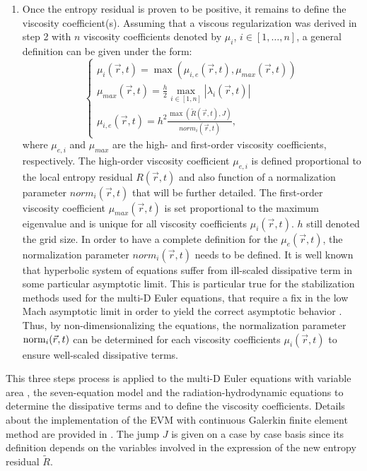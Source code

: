 \begin{enumerate}
\item Once the entropy residual is proven to be positive, it remains to define the viscosity coefficient(s). Assuming that a viscous regularization was derived in step 2 with $n$ viscosity coefficients denoted by $\mu_i$, $i\in \left[1, \dots, n\right]$, a general definition can be given under the form:
%
\begin{equation}
\left\{
\begin{array}{l}
\mu_i(\vec{r},t) = \max \left( \mu_{i,e}(\vec{r},t), \mu_{max}(\vec{r},t) \right) \nonumber \\
\mu_{max}(\vec{r},t) = \frac{h}{2} \max_{i\in \left[1,n\right]} |\lambda_i(\vec{r},t)| \nonumber \\
\mu_{i,e}(\vec{r},t) = h^2 \frac{\max\left(\tilde{R}(\vec{r},t), J\right)}{norm_i(\vec{r},t)}, \nonumber
\end{array}
\right.
\end{equation}
%
where $\mu_{e,i}$ and $\mu_{max}$ are the high- and first-order viscosity coefficients, respectively. The high-order viscosity coefficient $\mu_{e,i}$ is defined proportional to the local entropy residual $R(\vec{r},t)$ and also function of a normalization parameter $norm_i(\vec{r},t)$ that will be further detailed. The first-order viscosity coefficient $\mu_{max}(\vec{r},t)$ is set proportional to the maximum eigenvalue and is unique for all viscosity coefficients $\mu_i(\vec{r},t)$. $h$ still denoted the grid size. In order to have a complete definition for the $\mu_e(\vec{r},t)$, the normalization parameter $norm_i(\vec{r},t)$ needs to be defined. It is well known that hyperbolic system of equations suffer from ill-scaled dissipative term in some particular asymptotic limit. This is particular true for the stabilization methods used for the multi-D Euler equations, that require a fix in the low Mach asymptotic limit in order to yield the correct asymptotic behavior \cite{LowMach1, LowMach2}. Thus, by non-dimensionalizing the equations, the normalization parameter $\textrm{norm}_i(\vec{r},t)$ can be determined for each viscosity coefficients $\mu_i(\vec{r},t)$ to ensure well-scaled dissipative terms. 
\end{enumerate}
This three steps process is applied to the multi-D Euler equations with variable area , the seven-equation model  and the radiation-hydrodynamic equations  to determine the dissipative terms and to define the viscosity coefficients. Details about the implementation of the EVM with continuous Galerkin finite element method are provided in . The jump $J$ is given on a case by case basis since its definition depends on the variables involved in the expression of the new entropy residual $\tilde{R}$.
